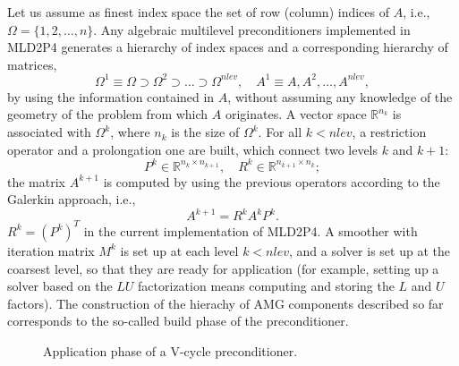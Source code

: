 Let us assume as finest index space the set of row (column) indices of $A$, i.e.,
$\Omega = \{1, 2, \ldots, n\}$. 
Any algebraic multilevel preconditioners implemented in MLD2P4 generates
a hierarchy of index spaces and a corresponding hierarchy of matrices,
\[ \Omega^1 \equiv \Omega \supset \Omega^2 \supset \ldots \supset \Omega^{nlev},
\quad A^1 \equiv A, A^2, \ldots, A^{nlev}, \]
by using the information contained in $A$, without assuming any
knowledge of the geometry of the problem from which $A$ originates.
A vector space $\mathbb{R}^{n_{k}}$ is associated with $\Omega^k$,
where $n_k$ is the size of $\Omega^k$.
For all $k < nlev$, a restriction operator and a prolongation one are built,
which connect two levels $k$ and $k+1$:
$$
    P^k \in \mathbb{R}^{n_k \times n_{k+1}}, \quad 
    R^k \in \mathbb{R}^{n_{k+1}\times n_k};
$$
the matrix $A^{k+1}$ is computed by using the previous operators according
to the Galerkin approach, i.e.,
$$
  A^{k+1}=R^kA^kP^k.
$$
$R^k=(P^k)^T$ in the current implementation of MLD2P4.
A smoother with iteration matrix $M^k$ is set up at each level $k < nlev$, and a solver
is set up at the coarsest level, so that they are ready for application 
(for example, setting up a solver based on the $LU$ factorization means computing
and storing the $L$ and $U$ factors). The construction of the hierachy of AMG components
described so far corresponds to the so-called build phase of the preconditioner.

\begin{figure}[t]
\begin{center} 
\caption{Application phase of a V-cycle preconditioner.\label{fig:application_alg}}
\end{center}
\end{figure}

